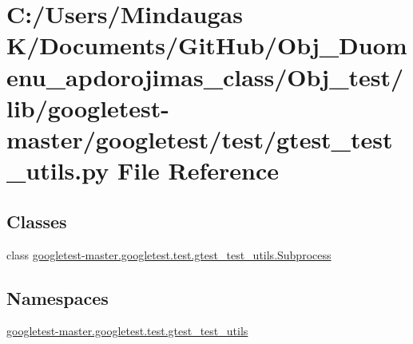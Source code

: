 \hypertarget{_obj__test_2lib_2googletest-master_2googletest_2test_2gtest__test__utils_8py}{}\section{C\+:/\+Users/\+Mindaugas K/\+Documents/\+Git\+Hub/\+Obj\+\_\+\+Duomenu\+\_\+apdorojimas\+\_\+class/\+Obj\+\_\+test/lib/googletest-\/master/googletest/test/gtest\+\_\+test\+\_\+utils.py File Reference}
\label{_obj__test_2lib_2googletest-master_2googletest_2test_2gtest__test__utils_8py}
\subsection*{Classes}
\begin{DoxyCompactItemize}
\item 
class \mbox{\hyperlink{classgoogletest-master_1_1googletest_1_1test_1_1gtest__test__utils_1_1_subprocess}{googletest-\/master.\+googletest.\+test.\+gtest\+\_\+test\+\_\+utils.\+Subprocess}}
\end{DoxyCompactItemize}
\subsection*{Namespaces}
\begin{DoxyCompactItemize}
\item 
 \mbox{\hyperlink{namespacegoogletest-master_1_1googletest_1_1test_1_1gtest__test__utils}{googletest-\/master.\+googletest.\+test.\+gtest\+\_\+test\+\_\+utils}}
\end{DoxyCompactItemize}
